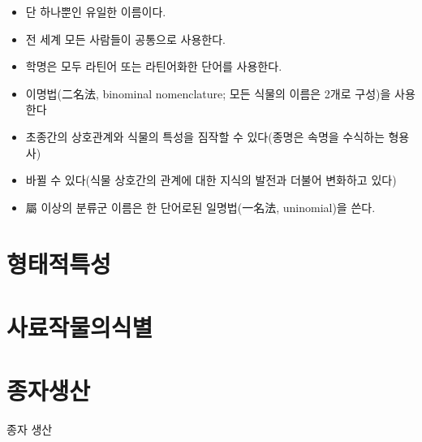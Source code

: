 \documentclass[]{book}
\providecommand{\tightlist}{%
  \setlength{\itemsep}{0pt}\setlength{\parskip}{0pt}}
\begin{document}
\begin{itemize}
\tightlist
\item
  단 하나뿐인 유일한 이름이다.
\item
  전 세계 모든 사람들이 공통으로 사용한다.
\item
  학명은 모두 라틴어 또는 라틴어화한 단어를 사용한다.
\item
  이명법(二名法, binominal nomenclature; 모든 식물의 이름은 2개로
  구성)을 사용한다
\item
  초종간의 상호관계와 식물의 특성을 짐작할 수 있다(종명은 속명을
  수식하는 형용사)
\item
  바뀔 수 있다(식물 상호간의 관계에 대한 지식의 발전과 더불어 변화하고
  있다)
\item
  屬 이상의 분류군 이름은 한 단어로된 일명법(一名法, uninomial)을 쓴다.
\end{itemize}

\chapter{형태적특성}

\chapter{사료작물의식별}

\chapter{종자생산}

종자 생산


\end{document}

